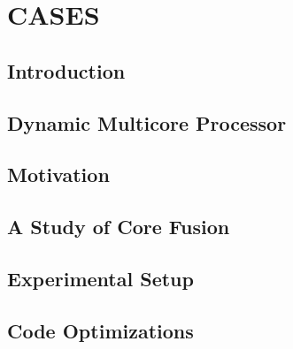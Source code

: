 \newcommand{\bm}[1]{\textit{#1}}
\setlength{\textfloatsep}{0.1cm}

\chapter{CASES}


\section{Introduction}\label{sect:introduction}


\section{Dynamic Multicore Processor}\label{sect:background}


\vspace{-2mm}
\section{Motivation}\label{sec:motivation}


\section{A Study of Core Fusion}\label{sec:lim_study}


\section{Experimental Setup}\label{sec:setup}


\section{Code Optimizations}\label{sec:opt}


